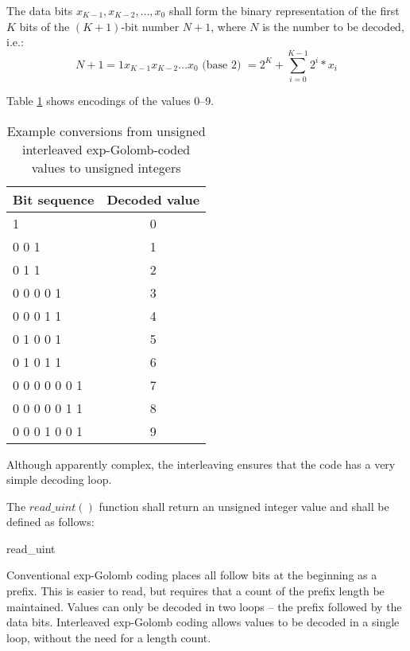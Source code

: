 The data bits $x_{K-1}, x_{K-2}, \hdots, x_0$ shall form the binary representation 
 of the first $K$ bits of the $(K+1)$-bit number 
$N+1$, where $N$ is the number to be decoded, i.e.:
\begin{equation*}
N+1=1 x_{K-1} x_{K-2}\hdots x_0 \text{ (base $2$) }=2^K+\sum_{i=0}^{K-1} 2^i * x_i
\end{equation*}

Table \ref{table:uegolcodings} shows encodings of the values 0--9.

\begin{table}[!ht]
\centering
\begin{tabular}{|l|c|}
\hline
\rowcolor[gray]{0.75}Bit sequence & Decoded value \\
\hline
1                 &  0\\
0 0 1             &  1\\
0 1 1             &  2\\
0 0 0 0 1         &  3\\
0 0 0 1 1         &  4\\
0 1 0 0 1         &  5\\
0 1 0 1 1         &  6\\
0 0 0 0 0 0 1     &  7\\
0 0 0 0 0 1 1     &  8\\
0 0 0 1 0 0 1     &  9\\
\hline
\end{tabular}

\caption{Example conversions from unsigned interleaved exp-Golomb-coded 
values to unsigned integers \label{table:uegolcodings}}
\end{table}

Although apparently complex, the interleaving ensures that the code has a very simple decoding loop. 

The $read\_uint()$ function shall return an unsigned integer value and shall be defined 
as follows:

\begin{pseudo}{read\_uint}{}
  \bsEND
\bsEND
{}
\end{pseudo}

\begin{informative}
Conventional exp-Golomb coding places all follow bits at the beginning as a prefix. This is
easier to read, but requires that a count of the prefix length be maintained. Values can only
be decoded in two loops -- the prefix followed by the data bits. Interleaved exp-Golomb 
coding allows values to be decoded in a single loop, without the need for a length count.
\end{informative}

